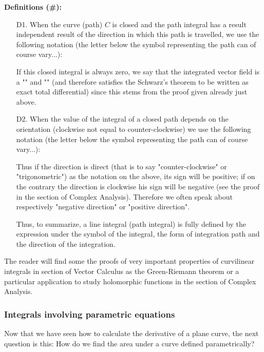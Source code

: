 	\textbf{Definitions (\#\mydef):}
	\begin{enumerate}
		\item[D1.] When the curve (path) $C$ is closed and the path integral has a result independent result of the direction in which this path is travelled, we use the following notation (the letter below the symbol representing the path can of course vary...):
		
		If this closed integral is always zero, we say that the integrated vector field is a "" and "" (and therefore satisfies the Schwarz's theorem to be written as exact total differential) since this stems from the proof given already just above.
		
		\item[D2.] \label{closed path orientation}When the value of the integral of a closed path depends on the orientation (clockwise not equal to counter-clockwise) we use the following notation (the letter below the symbol representing the path can of course vary...):
		
		Thus if the direction is direct (that is to say "counter-clockwise" or "trigonometric") as the notation on the above, its sign will be positive; if on the contrary the direction is clockwise his sign will be negative (see the proof in the section of Complex Analysis). Therefore we often speak about respectively "negative direction" or "positive direction".
		
		Thus, to summarize, a line integral (path integral) is fully defined by the expression under the symbol of the integral, the form of integration path and the direction of the integration.
	\end{enumerate}
	\begin{tcolorbox}[title=Remark,colframe=black,arc=10pt]
	The reader will find some the proofs of very important properties of curvilinear integrals  in section of Vector Calculus as the Green-Riemann theorem or a particular application to study holomorphic functions in the section of Complex Analysis.
	\end{tcolorbox}
	
	\subsubsection{Integrals involving parametric equations}
	Now that we have seen how to calculate the derivative of a plane curve, the next question is this: How do we find the area under a curve defined parametrically? 
	
